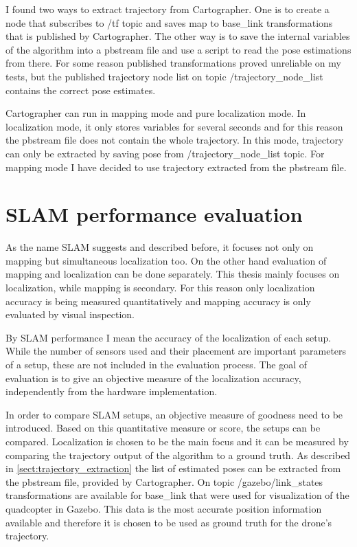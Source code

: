 I found two ways to extract trajectory from Cartographer. One is to create a node that subscribes to
/tf topic and saves map to base\_link transformations that is published by Cartographer. The other
way is to save the internal variables of the algorithm into a pbstream file and use a script to read
the pose estimations from there. For some reason published transformations proved unreliable on my
tests, but the published trajectory node list on topic /trajectory\_node\_list contains the correct
pose estimates.

Cartographer can run in mapping mode and pure localization mode. In localization mode, it
only stores variables for several seconds and for this reason the pbstream file does not contain
the whole trajectory. In this mode, trajectory can only be extracted by saving pose from 
/trajectory\_node\_list topic. For mapping mode I have decided to use trajectory extracted from 
the pbstream file.




\section{SLAM performance evaluation}
As the name SLAM suggests and described before, it focuses not only on mapping but simultaneous 
localization too. On the other hand evaluation of mapping and localization can be done separately.
This thesis mainly focuses on localization, while mapping is secondary. For this
reason only localization accuracy is being measured quantitatively and mapping accuracy is 
only evaluated by visual inspection.

By SLAM performance I mean the accuracy of the localization of each setup. While the number of 
sensors used and their placement are important parameters of a setup, these are not included in
the evaluation process. The goal of evaluation is to give an objective measure of the localization
accuracy, independently from the hardware implementation. 

In order to compare SLAM setups, an objective measure of goodness need to be introduced. Based 
on this quantitative measure or score, the setups can be compared. Localization is chosen to be 
the main focus and it can be measured by comparing the trajectory output of the algorithm
to a ground truth. 
As described in \ref{sect:trajectory_extraction} the list of estimated poses can be extracted 
from the pbstream file, provided by Cartographer. On topic /gazebo/link\_states transformations
are available for base\_link that were used for visualization of the quadcopter in Gazebo. 
This data is the most accurate position information available and therefore it is chosen to be used as
ground truth for the drone's trajectory.

